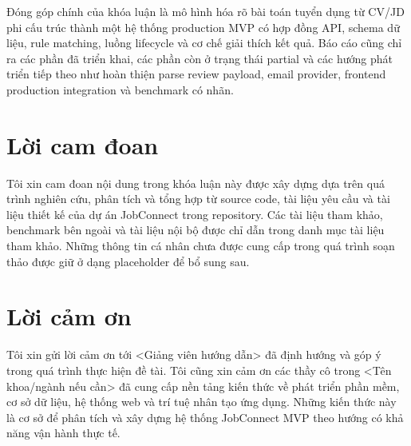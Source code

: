 \documentclass[12pt,a4paper,oneside]{extreport}
\newcommand{\placeholder}[1]{\textless{}#1\textgreater{}}
\begin{document}
Đóng góp chính của khóa luận là mô hình hóa rõ bài toán tuyển dụng từ CV/JD phi cấu trúc thành một hệ thống production MVP có hợp đồng API, schema dữ liệu, rule matching, luồng lifecycle và cơ chế giải thích kết quả. Báo cáo cũng chỉ ra các phần đã triển khai, các phần còn ở trạng thái partial và các hướng phát triển tiếp theo như hoàn thiện parse review payload, email provider, frontend production integration và benchmark có nhãn.

\chapter*{Lời cam đoan}
Tôi xin cam đoan nội dung trong khóa luận này được xây dựng dựa trên quá trình nghiên cứu, phân tích và tổng hợp từ source code, tài liệu yêu cầu và tài liệu thiết kế của dự án JobConnect trong repository. Các tài liệu tham khảo, benchmark bên ngoài và tài liệu nội bộ được chỉ dẫn trong danh mục tài liệu tham khảo. Những thông tin cá nhân chưa được cung cấp trong quá trình soạn thảo được giữ ở dạng placeholder để bổ sung sau.

\chapter*{Lời cảm ơn}
Tôi xin gửi lời cảm ơn tới \placeholder{Giảng viên hướng dẫn} đã định hướng và góp ý trong quá trình thực hiện đề tài. Tôi cũng xin cảm ơn các thầy cô trong \placeholder{Tên khoa/ngành nếu cần} đã cung cấp nền tảng kiến thức về phát triển phần mềm, cơ sở dữ liệu, hệ thống web và trí tuệ nhân tạo ứng dụng. Những kiến thức này là cơ sở để phân tích và xây dựng hệ thống JobConnect MVP theo hướng có khả năng vận hành thực tế.

\tableofcontents
\clearpage
\begingroup
{}
\setlength{\parskip}{0pt}
\listoftables
\endgroup
{}
\clearpage
\listoffigures
{}
\clearpage
\end{document}
